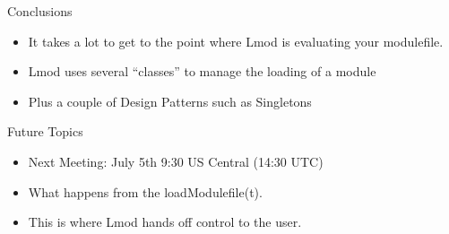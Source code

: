 \documentclass{beamer}
\begin{document}



\begin{frame}{Conclusions}
  \begin{itemize}
    \item It takes a lot to get to the point where Lmod is evaluating
      your modulefile.
    \item Lmod uses several ``classes'' to manage the loading of a
      module
    \item Plus a couple of Design Patterns such as Singletons  
  \end{itemize}
\end{frame}

\begin{frame}{Future Topics}
  \begin{itemize}
    \item Next Meeting: July 5th 9:30 US Central (14:30 UTC)
    \item What happens from the loadModulefile(t).
    \item This is where Lmod hands off control to the user.
  \end{itemize}
\end{frame}
\end{document}
